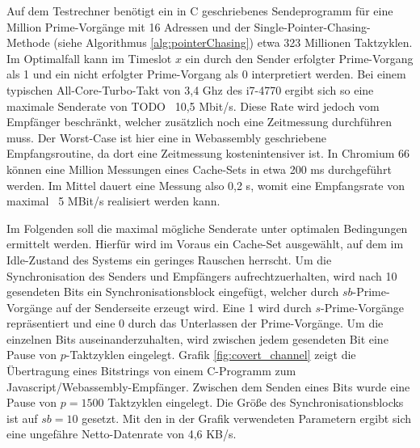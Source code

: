 Auf dem Testrechner benötigt ein in C geschriebenes Sendeprogramm für eine Million Prime-Vorgänge mit 16 Adressen und der Single-Pointer-Chasing-Methode (siehe Algorithmus \ref{alg:pointerChasing}) etwa 323 Millionen Taktzyklen.
Im Optimalfall kann im Timeslot $x$ ein durch den Sender erfolgter Prime-Vorgang als 1 und ein nicht erfolgter Prime-Vorgang  als 0 interpretiert werden.
Bei einem typischen All-Core-Turbo-Takt von 3,4 Ghz des i7-4770 ergibt sich so eine maximale Senderate von TODO ~10,5 Mbit/s.
Diese Rate wird jedoch vom Empfänger beschränkt, welcher zusätzlich noch eine Zeitmessung durchführen muss. Der Worst-Case ist hier eine in Webassembly geschriebene Empfangsroutine, da dort eine Zeitmessung kostenintensiver ist. In Chromium 66 können eine Million Messungen eines Cache-Sets in etwa 200 ms durchgeführt werden.
Im Mittel dauert eine Messung also 0,2 \textmu s, womit eine Empfangsrate von maximal ~5 MBit/s realisiert werden kann.

Im Folgenden soll die maximal mögliche Senderate unter optimalen Bedingungen ermittelt werden. 
Hierfür wird im Voraus ein Cache-Set ausgewählt, auf dem im Idle-Zustand des Systems ein geringes Rauschen herrscht.
Um die Synchronisation des Senders und Empfängers aufrechtzuerhalten, wird nach 10 gesendeten Bits ein Synchronisationsblock eingefügt, welcher durch $sb$-Prime-Vorgänge auf der Senderseite erzeugt wird. 
Eine 1 wird durch $s$-Prime-Vorgänge repräsentiert und eine 0 durch das Unterlassen der Prime-Vorgänge. 
Um die einzelnen Bits auseinanderzuhalten, wird zwischen jedem gesendeten Bit eine Pause von $p$-Taktzyklen eingelegt. 
Grafik \ref{fig:covert_channel} zeigt die Übertragung eines Bitstrings von einem C-Programm zum Javascript/Webassembly-Empfänger.
Zwischen dem Senden eines Bits wurde eine Pause von $p=1500$ Taktzyklen eingelegt.
Die Größe des Synchronisationsblocks ist auf $sb=10$ gesetzt.
Mit den in der Grafik verwendeten Parametern ergibt sich eine ungefähre Netto-Datenrate von 4,6 KB/s.

